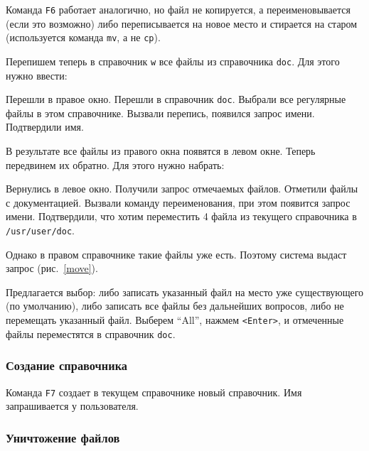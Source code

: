 Команда {\tt F6} работает аналогично, но файл не копируется,
а переименовывается (если это возможно) либо переписывается на новое
место и стирается на старом (используется команда {\tt mv}, а не {\tt cp}).

Перепишем теперь в справочник {\tt w} все файлы из справочника {\tt doc}.
Для этого нужно ввести:

\begin{example}
Перешли в правое окно.
Перешли в справочник {\tt doc}.
Выбрали все регулярные файлы в этом справочнике.
Вызвали перепись, появился запрос имени.
Подтвердили имя.
\end{example}

В результате все файлы из правого окна появятся в левом окне.
Теперь передвинем их обратно. Для этого нужно набрать:

\begin{example}
Вернулись в левое окно.
\litem{{\tt +}}
Получили запрос отмечаемых файлов.
Отметили файлы с документацией.
Вызвали команду переименования, при этом появится запрос имени.
Подтвердили, что хотим переместить 4 файла из
текущего справочника в {\tt /usr/user/doc}.
\end{example}

Однако в правом справочнике такие файлы уже есть. Поэтому
система выдаст запрос (рис.~\ref{move}).


Предлагается выбор: либо записать указанный файл на место уже
существующего (по умолчанию), либо записать все файлы без дальнейших вопросов,
либо не перемещать указанный файл.
Выберем ``All'', нажмем {\tt <Enter>}, и отмеченные файлы переместятся в
справочник {\tt doc}.

\subsubsection{Создание справочника}

Команда {\tt F7} создает в текущем справочнике новый
справочник. Имя запрашивается у пользователя.

\subsubsection{Уничтожение файлов}

